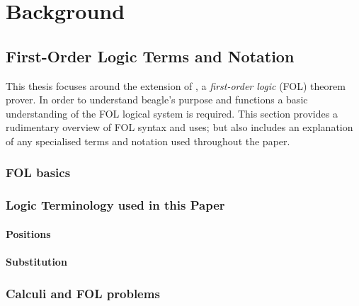 
\chapter{Background}
\label{cha:background}

\section{First-Order Logic Terms and Notation}
\label{sec:senfol}

This thesis focuses around the extension of \beagle, a \emph{first-order logic} (FOL) theorem prover.
In order to understand beagle's purpose and functions a basic understanding of the FOL logical system
is required. This section provides a rudimentary overview of FOL syntax and uses;
but also includes an explanation of any specialised terms and notation used throughout the paper.

\subsection{FOL basics}

\subsection{Logic Terminology used in this Paper}

\subsubsection{Positions}

\subsubsection{Substitution}

\subsection{Calculi and FOL problems}

